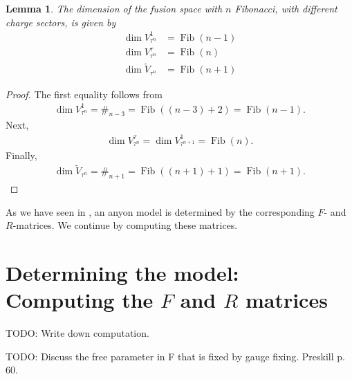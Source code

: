 \documentclass[a4paper,10pt,oneside]{book}
\theoremstyle{plain}
\newtheorem{lemma}[theorem]{Lemma}
\theoremstyle{definition}
\theoremstyle{remark}
\DeclareMathOperator{\Fib}{Fib}
\begin{document}
\begin{lemma}\label{lemma:fibonacci fusion space dimension}
  The dimension of the fusion space with $n$ Fibonacci, with different charge sectors, is given by
  \begin{align*}
    \dim V_{τ^n}^1 &= \Fib(n-1) \\
    \dim V_{τ^n}^τ &= \Fib(n) \\
    \dim \widetilde{V}_{τ^n} &= \Fib(n+1)
  \end{align*}
\end{lemma}

\begin{proof}
  The first equality follows from
  \begin{align*}
    \dim V_{τ^n}^1 = \#_{n-3} = \Fib((n-3)+2) = \Fib(n-1).
  \end{align*}
  Next,
  \begin{align*}
    \dim V_{τ^n}^τ = \dim V_{τ^{n+1}}^1 = \Fib(n).
  \end{align*}
  Finally,
  \begin{align*}
    \dim \widetilde{V}_{τ^n} = \#_{n+1} = \Fib((n+1)+1) = \Fib(n+1).
  \end{align*}
\end{proof}

As we have seen in \label{anyon models}, an anyon model is determined by the corresponding $F$- and $R$-matrices. We continue by computing these matrices.






\section{Determining the model: Computing the $F$ and $R$ matrices}

TODO: Write down computation.

TODO: Discuss the free parameter in F that is fixed by gauge fixing. Preskill p. 60.

\end{document}

